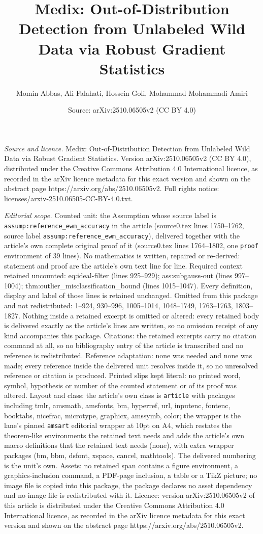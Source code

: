 \documentclass[10pt,a4paper]{amsart}
\title[Medix: Out-of-Distribution Detection from Unlabeled Wild Dat]{Medix: Out-of-Distribution Detection from Unlabeled Wild Data via Robust Gradient Statistics}
\author{Momin Abbas, Ali Falahati, Hossein Goli, Mohammad Mohammadi Amiri}
\date{Source: arXiv:2510.06505v2 (CC BY 4.0)}
\begin{document}
\maketitle

\noindent\emph{Source and licence.} Medix: Out-of-Distribution Detection from Unlabeled Wild Data via Robust Gradient Statistics. Version arXiv:2510.06505v2 (CC BY 4.0), distributed under the Creative Commons Attribution 4.0 International licence, as recorded in the arXiv licence metadata for this exact version and shown on the abstract page https://arxiv.org/abs/2510.06505v2. Full rights notice: licenses/arxiv-2510.06505-CC-BY-4.0.txt.\par\smallskip

\noindent\textit{Editorial scope.} Counted unit: the Assumption whose source label is \texttt{assump:reference\_ewm\_accuracy} in the article (source0.tex lines 1750--1762, source label \texttt{assump:reference\_ewm\_accuracy}), delivered together with the article's own complete original proof of it (source0.tex lines 1764--1802, one \texttt{proof} environment of 39 lines). No mathematics is written, repaired or re-derived: statement and proof are the article's own text line for line. Required context retained uncounted: eq:ideal-filter (lines 925--929); ass:subgauss-out (lines 997--1004); thm:outlier\_misclassification\_bound (lines 1015--1047). Every definition, display and label of those lines is retained unchanged. Omitted from this package and not redistributed: 1--924, 930--996, 1005--1014, 1048--1749, 1763--1763, 1803--1827. Nothing inside a retained excerpt is omitted or altered: every retained body is delivered exactly as the article's lines are written, so no omission receipt of any kind accompanies this package. Citations: the retained excerpts carry no citation command at all, so no bibliography entry of the article is transcribed and no reference is redistributed. Reference adaptation: none was needed and none was made; every reference inside the delivered unit resolves inside it, so no unresolved reference or citation is produced. Printed slips kept literal: no printed word, symbol, hypothesis or number of the counted statement or of its proof was altered. Layout and class: the article's own class is \texttt{article} with packages including tmlr, amsmath, amsfonts, bm, hyperref, url, inputenc, fontenc, booktabs, nicefrac, microtype, graphicx, amssymb, color; the wrapper is the lane's pinned \texttt{amsart} editorial wrapper at 10pt on A4, which restates the theorem-like environments the retained text needs and adds the article's own macro definitions that the retained text needs (none), with extra wrapper packages (bm, bbm, dsfont, xspace, cancel, mathtools). The delivered numbering is the unit's own. Assets: no retained span contains a figure environment, a graphics-inclusion command, a PDF-page inclusion, a table or a TikZ picture; no image file is copied into this package, the package declares no asset dependency and no image file is redistributed with it. Licence: version arXiv:2510.06505v2 of this article is distributed under the Creative Commons Attribution 4.0 International licence, as recorded in the arXiv licence metadata for this exact version and shown on the abstract page https://arxiv.org/abs/2510.06505v2. 
\end{document}

